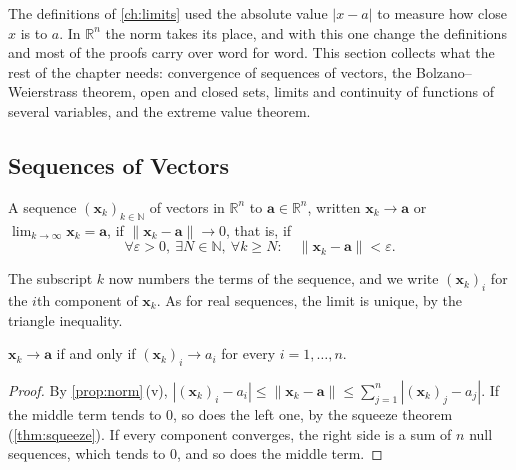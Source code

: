 The definitions of \cref{ch:limits} used the absolute value $|x-a|$ to measure how close $x$ is to $a$. In $\mathbb R^n$ the norm takes its place, and with this one change the definitions and most of the proofs carry over word for word. This section collects what the rest of the chapter needs: convergence of sequences of vectors, the Bolzano--Weierstrass theorem, open and closed sets, limits and continuity of functions of several variables, and the extreme value theorem.

\subsection{Sequences of Vectors}

\begin{definition}
\label{def:convergence-rn}
A sequence $(\mathbf x_k)_{k\in\mathbb N}$ of vectors in $\mathbb R^n$  to $\mathbf a\in\mathbb R^n$, written $\mathbf x_k\to\mathbf a$ or $\lim_{k\to\infty}\mathbf x_k=\mathbf a$, if $\|\mathbf x_k-\mathbf a\|\to0$, that is, if
\[
\forall\varepsilon>0,\ \exists N\in\mathbb N,\ \forall k\ge N:\quad\|\mathbf x_k-\mathbf a\|<\varepsilon .
\]
\end{definition}

The subscript $k$ now numbers the terms of the sequence, and we write $(\mathbf x_k)_i$ for the $i$th component of $\mathbf x_k$. As for real sequences, the limit is unique, by the triangle inequality.

\begin{proposition}
\label{prop:componentwise}
$\mathbf x_k\to\mathbf a$ if and only if $(\mathbf x_k)_i\to a_i$ for every $i=1,\ldots,n$.
\end{proposition}

\begin{proof}
By \cref{prop:norm}\,(v), $|(\mathbf x_k)_i-a_i|\le\|\mathbf x_k-\mathbf a\|\le\sum_{j=1}^n|(\mathbf x_k)_j-a_j|$. If the middle term tends to $0$, so does the left one, by the squeeze theorem (\cref{thm:squeeze}). If every component converges, the right side is a sum of $n$ null sequences, which tends to $0$, and so does the middle term.
\end{proof}

